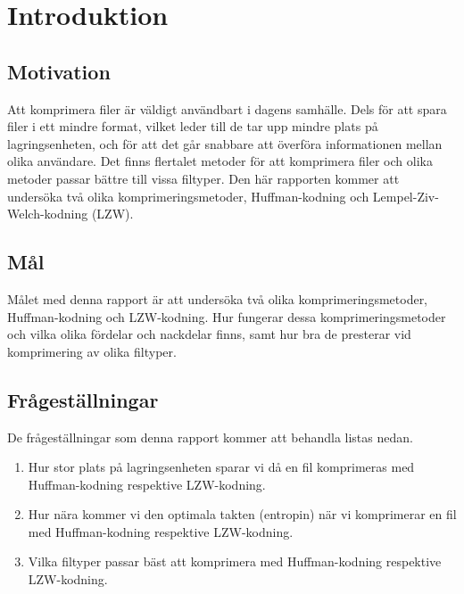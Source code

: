 

\chapter{Introduktion}
\label{cha:introduction}
\section{Motivation}
\label{sec:motivation}
Att komprimera filer är väldigt användbart i dagens samhälle. Dels för att spara filer i ett mindre format, vilket leder till de tar upp mindre plats på lagringsenheten, och för att det går snabbare att överföra informationen mellan olika användare. Det finns flertalet metoder för att komprimera filer och olika metoder passar bättre till vissa filtyper. Den här rapporten kommer att undersöka två olika komprimeringsmetoder, Huffman-kodning och Lempel-Ziv-Welch-kodning (LZW).

\section{Mål}
\label{sec:aim}

Målet med denna rapport är att undersöka två olika komprimeringsmetoder, Huffman-kodning och LZW-kodning. Hur fungerar dessa komprimeringsmetoder och vilka olika fördelar och nackdelar finns, samt hur bra de presterar vid komprimering av olika filtyper.

\section{Frågeställningar}
\label{sec:research-questions}

De frågeställningar som denna rapport kommer att behandla listas nedan.

\begin{enumerate}
\item Hur stor plats på lagringsenheten sparar vi då en fil komprimeras med Huffman-kodning respektive LZW-kodning.

\item Hur nära kommer vi den optimala takten (entropin) när vi komprimerar en fil med Huffman-kodning respektive LZW-kodning.

\item Vilka filtyper passar bäst att komprimera med Huffman-kodning respektive LZW-kodning.

\end{enumerate}


